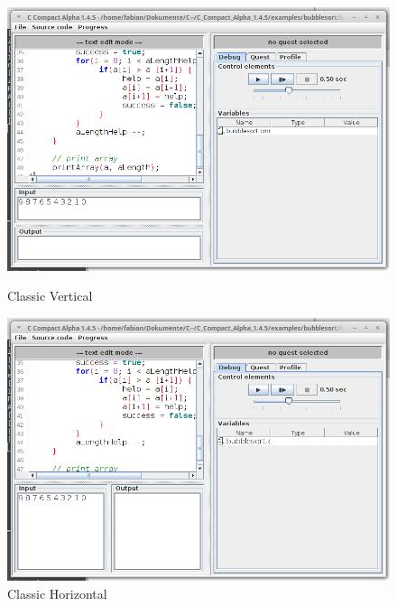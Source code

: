 \begin{figure}
\centering
	\begin{minipage}{0.45\textwidth}
		\centering
		\includegraphics[width=1.0\textwidth]{./media/images/gui/main/orientations/CCompact-gui-1.png}
		\caption{Classic Vertical}\label{fig:gui-main-left-o1}
	\end{minipage}\hfill
	\begin{minipage}{0.45\textwidth}
		\centering
		\includegraphics[width=1.0\textwidth]{./media/images/gui/main/orientations/CCompact-gui-2.png}
		\caption{Classic Horizontal}\label{fig:gui-main-left-o2}
	\end{minipage}
\end{figure}

